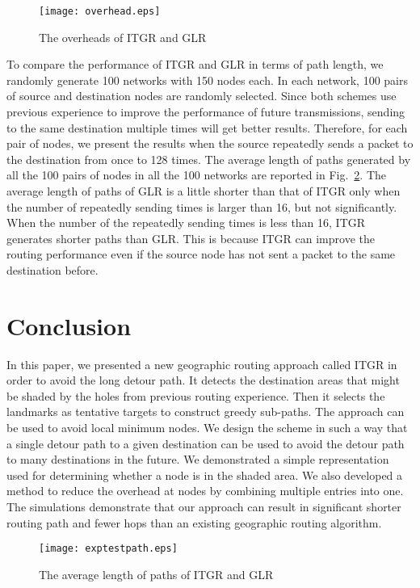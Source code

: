 \documentclass[3p,times]{elsarticle}
\begin{document}
\begin{figure}[!htp]
\begin{center}
\texttt{[image: overhead.eps]}
\end{center}
\caption{The overheads of ITGR and GLR}
\label{overhead}
\end{figure}



To compare the performance of ITGR and GLR in terms of path length,
we randomly generate 100 networks with 150 nodes each.
In each network, 100 pairs
of source and destination nodes are randomly selected.
Since both schemes use previous experience to improve the performance of future transmissions,
sending to the same destination multiple times will get better results.
Therefore,
for each pair of nodes,
we present the results when
the source repeatedly sends a packet to the destination from once to 128 times.
The average length of paths generated by all the  100 pairs of nodes in all the 100 networks are reported in Fig.~\ref{exptestpath}.
The average length of paths
of GLR is a little shorter than that of ITGR only when the number of repeatedly sending times is larger
than 16, but not significantly.
When the number of the repeatedly sending times is less than 16, ITGR generates shorter paths than GLR.
This is because ITGR can improve the routing performance even if the source node has not sent a packet
to the same destination before.







\section{Conclusion}
\label{conclusion}


In this paper, we presented a new geographic routing approach called ITGR
in order to avoid the long detour path. It detects the destination areas
that might be shaded by the holes from previous routing experience.
Then it selects the landmarks as tentative targets to construct greedy sub-paths.
The approach can be used to avoid local minimum nodes.
We design the scheme in such a way that
a single detour path to a given destination
can be used to avoid the detour path to many destinations in the future.
We demonstrated a simple representation used for determining whether a node is in
the shaded area. We also developed a method to reduce the
overhead at nodes by combining multiple entries into one.
The simulations demonstrate that our approach can result in significant shorter
routing path and fewer hops than an existing geographic routing algorithm.




\begin{figure}[!hb]
\begin{center}
\texttt{[image: exptestpath.eps]}
\end{center}
\caption{The average length of paths of ITGR and GLR}
\label{exptestpath}
\end{figure}
















~~~\\
~~~\\
\end{document}
